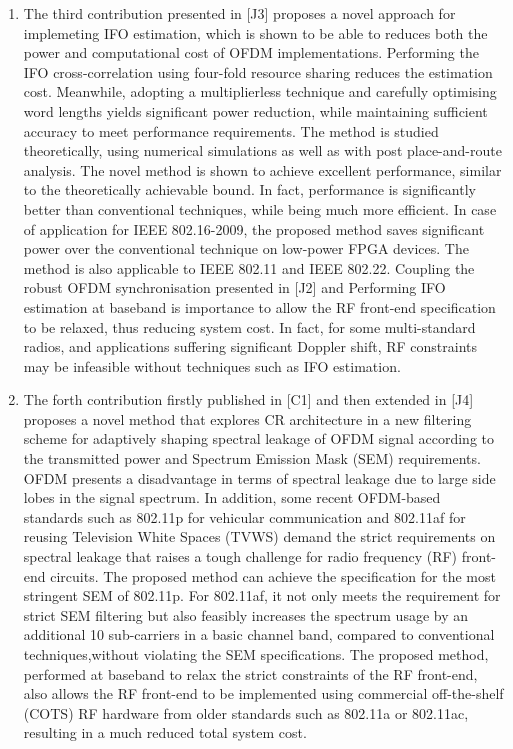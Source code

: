 \begin{enumerate}
\item The third contribution presented in [J3] proposes a novel approach for implemeting IFO estimation, which is shown to be able to reduces both the power and computational cost of OFDM implementations. 
Performing the IFO cross-correlation using four-fold resource sharing reduces the estimation cost. Meanwhile, adopting a multiplierless technique and carefully optimising word lengths yields significant power reduction, while maintaining sufficient accuracy to meet performance requirements. 
The method is studied theoretically, using numerical simulations as well as with post place-and-route analysis. 
The novel method is shown to achieve excellent performance, similar to the theoretically achievable bound. 
In fact, performance is significantly better than conventional techniques, while being much more efficient. 
In case of application for IEEE 802.16-2009, the proposed method saves significant power over the conventional technique on low-power FPGA devices. The method is also applicable to IEEE 802.11 and IEEE 802.22.
Coupling the robust OFDM synchronisation presented in [J2] and Performing IFO estimation at baseband is importance to allow the RF front-end specification to be relaxed, thus reducing system cost. 
In fact, for some multi-standard radios, and applications suffering significant Doppler shift, RF constraints may be infeasible without techniques such as IFO estimation.

\item The forth contribution firstly published in [C1] and then extended in [J4] proposes a novel method that explores CR architecture in a new filtering scheme for adaptively shaping spectral leakage of OFDM signal according to the transmitted power and Spectrum Emission Mask (SEM) requirements.
OFDM presents a disadvantage in terms of spectral leakage due to large side lobes in the signal spectrum. 
In addition, some recent OFDM-based standards such as 802.11p for vehicular communication and 802.11af for reusing Television White Spaces (TVWS) demand the strict requirements on spectral leakage that raises a tough challenge for radio frequency (RF) front-end circuits.
The proposed method can achieve the specification for the most stringent SEM of 802.11p. 
For 802.11af, it not only meets the requirement for strict SEM filtering but also feasibly increases the spectrum usage by an additional 10 sub-carriers in a basic channel band, compared to conventional techniques,without violating the SEM specifications.
The proposed method, performed at baseband to relax the strict constraints of the RF front-end, also allows the RF front-end to be implemented using commercial off-the-shelf (COTS) RF hardware from older standards such as 802.11a or 802.11ac, resulting in a much reduced total system cost.


\end{enumerate}
